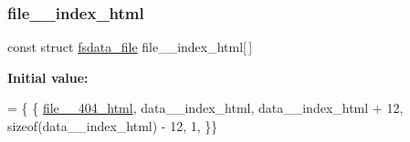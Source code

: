 \subsubsection{\texorpdfstring{file\+\_\+\+\_\+index\+\_\+html}{file\_\_index\_html}}
{\footnotesize\ttfamily const struct \hyperlink{structfsdata__file}{fsdata\+\_\+file} file\+\_\+\+\_\+index\+\_\+html\mbox{[}$\,$\mbox{]}}

{\bfseries Initial value\+:}
\begin{DoxyCode}
= \{ \{
\hyperlink{native_2lwip_2src_2apps_2httpd_2fsdata_8c_af64867f4c16b25ab41d4deef1e39f2f4}{file\_\_404\_html},
data\_\_index\_html,
data\_\_index\_html + 12,
\textcolor{keyword}{sizeof}(data\_\_index\_html) - 12,
1,
\}\}
\end{DoxyCode}
